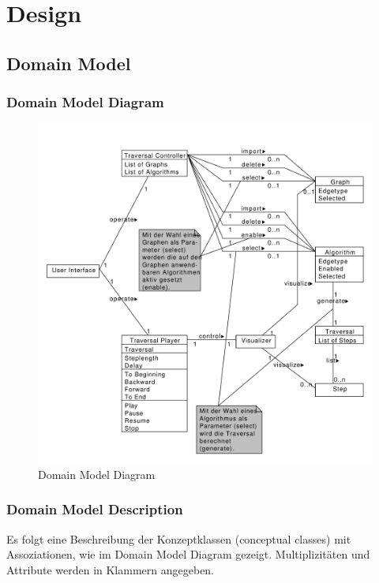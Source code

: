 \newpage		%
\mbox{} 		%
\thispagestyle{empty} 	%
\chapter{Design}
% 
\section{Domain Model}
\label{sec:Domain Model}
% 
\subsection{Domain Model Diagram}
\label{subsec:Domain Model Diagram}
\begin{figure}[H]
    \includegraphics[totalheight=0.6\textheight]{diagrams/domain-model-diagram.pdf}
    \caption{Domain Model Diagram}
    \label{fig:domain_model_diagram}
\end{figure}
% 
\subsection{Domain Model Description}
\label{subsec:Domain Model Description}
Es folgt eine Beschreibung der Konzeptklassen (conceptual classes) mit Assoziationen, wie im Domain Model Diagram gezeigt. Multiplizit\"aten und Attribute werden in Klammern angegeben.
% 
